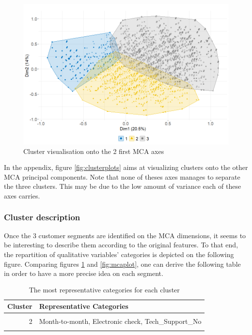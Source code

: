 \documentclass[
]{book}
\begin{document}
\begin{figure}

{\centering \includegraphics[width=12.83in]{./imgs/cluster_plot} 

}

\caption{Cluster visualisation onto the 2 first MCA axes}\label{fig:clusterplot}
\end{figure}

In the appendix, figure \ref{fig:clusterplots} aims at visualizing clusters onto the other MCA principal components. Note that none of theses axes manages to separate the three clusters. This may be due to the low amount of variance each of these axes carries.

\hypertarget{cluster-description}{%
\subsubsection*{Cluster description}\label{cluster-description}}

Once the 3 customer segments are identified on the MCA dimensions, it seems to be interesting to describe them according to the original features. To that end, the repartition of qualitative variables' categories is depicted on the following figure. Comparing figures \ref{fig:clusterplot} and \ref{fig:mcaplot}, one can derive the following table in order to have a more precise idea on each segment.

\begin{table}[H]

\caption{\label{tab:unnamed-chunk-23}The most representative categories for each cluster}
\centering
\begin{tabular}[t]{rl}
\toprule
Cluster & Representative Categories\\
\midrule
\cellcolor{gray!6}{1} & \cellcolor{gray!6}{Mailed\_check, Internet\_Service\_No}\\
2 & Month-to-month, Electronic check, Tech\_Support\_No\\
\cellcolor{gray!6}{3} & \cellcolor{gray!6}{Two year, Credit card, Tech\_Support\_Yes}\\
\bottomrule
\end{tabular}
\end{table}
\end{document}
